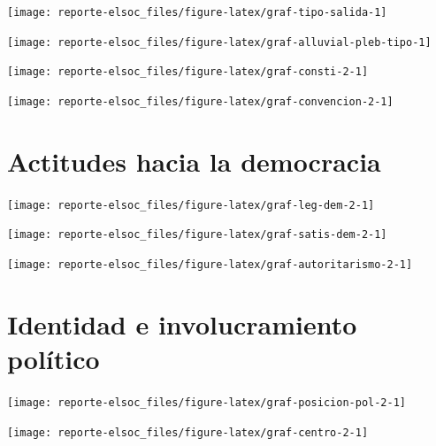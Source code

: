 \documentclass[
  12pt,
]{book}
\begin{document}
\begin{center}\texttt{[image: reporte-elsoc\_files/figure-latex/graf-tipo-salida-1]} \end{center}

\begin{center}\texttt{[image: reporte-elsoc\_files/figure-latex/graf-alluvial-pleb-tipo-1]} \end{center}

\begin{center}\texttt{[image: reporte-elsoc\_files/figure-latex/graf-consti-2-1]} \end{center}

\begin{center}\texttt{[image: reporte-elsoc\_files/figure-latex/graf-convencion-2-1]} \end{center}

\hypertarget{actitudes-hacia-la-democracia}{%
\section{Actitudes hacia la democracia}\label{actitudes-hacia-la-democracia}}

\begin{center}\texttt{[image: reporte-elsoc\_files/figure-latex/graf-leg-dem-2-1]} \end{center}

\begin{center}\texttt{[image: reporte-elsoc\_files/figure-latex/graf-satis-dem-2-1]} \end{center}

\begin{center}\texttt{[image: reporte-elsoc\_files/figure-latex/graf-autoritarismo-2-1]} \end{center}

\hypertarget{identidad-e-involucramiento-poluxedtico}{%
\section{Identidad e involucramiento político}\label{identidad-e-involucramiento-poluxedtico}}

\begin{center}\texttt{[image: reporte-elsoc\_files/figure-latex/graf-posicion-pol-2-1]} \end{center}

\begin{center}\texttt{[image: reporte-elsoc\_files/figure-latex/graf-centro-2-1]} \end{center}
\end{document}
